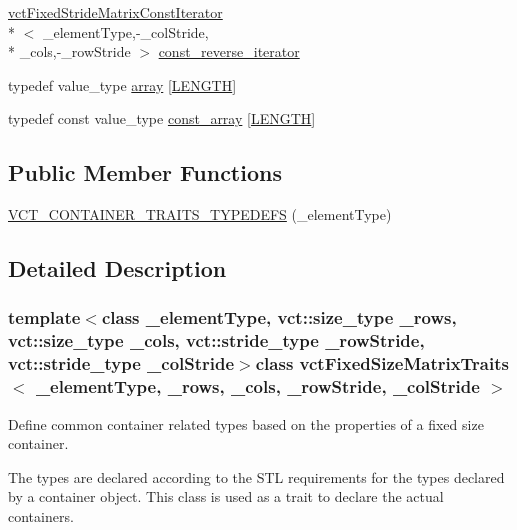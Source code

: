 \begin{DoxyCompactItemize}
\hyperlink{classvct_fixed_stride_matrix_const_iterator}{vct\-Fixed\-Stride\-Matrix\-Const\-Iterator}\\*
$<$ \-\_\-element\-Type,-\/\-\_\-col\-Stride, \\*
\-\_\-cols,-\/\-\_\-row\-Stride $>$ \hyperlink{classvct_fixed_size_matrix_traits_a362cff0931f811552609307e80af3eab}{const\-\_\-reverse\-\_\-iterator}
\item 
typedef value\-\_\-type \hyperlink{classvct_fixed_size_matrix_traits_a3894b24d65c8d4b54d17192001d28dc2}{array} \mbox{[}\hyperlink{classvct_fixed_size_matrix_traits_a99506cd46619256b0ad9c09afc88cfe4a6b0f4f5000cd410b68ea5903cd33ec2b}{L\-E\-N\-G\-T\-H}\mbox{]}
\item 
typedef const value\-\_\-type \hyperlink{classvct_fixed_size_matrix_traits_ac7459b07165b6f472e2f5238cc069b55}{const\-\_\-array} \mbox{[}\hyperlink{classvct_fixed_size_matrix_traits_a99506cd46619256b0ad9c09afc88cfe4a6b0f4f5000cd410b68ea5903cd33ec2b}{L\-E\-N\-G\-T\-H}\mbox{]}
\end{DoxyCompactItemize}
\subsection*{Public Member Functions}
\begin{DoxyCompactItemize}
\item 
\hyperlink{classvct_fixed_size_matrix_traits_a9ac65f0b7d8723c8e13b131e6941096b}{V\-C\-T\-\_\-\-C\-O\-N\-T\-A\-I\-N\-E\-R\-\_\-\-T\-R\-A\-I\-T\-S\-\_\-\-T\-Y\-P\-E\-D\-E\-F\-S} (\-\_\-element\-Type)
\end{DoxyCompactItemize}


\subsection{Detailed Description}
\subsubsection*{template$<$class \-\_\-element\-Type, vct\-::size\-\_\-type \-\_\-rows, vct\-::size\-\_\-type \-\_\-cols, vct\-::stride\-\_\-type \-\_\-row\-Stride, vct\-::stride\-\_\-type \-\_\-col\-Stride$>$class vct\-Fixed\-Size\-Matrix\-Traits$<$ \-\_\-element\-Type, \-\_\-rows, \-\_\-cols, \-\_\-row\-Stride, \-\_\-col\-Stride $>$}

Define common container related types based on the properties of a fixed size container. 

The types are declared according to the S\-T\-L requirements for the types declared by a container object. This class is used as a trait to declare the actual containers.

